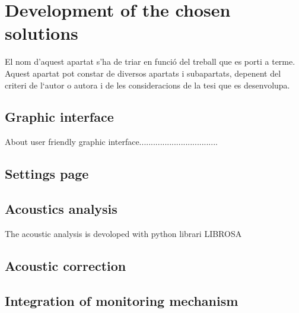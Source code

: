 \chapter{Development of the chosen solutions}

El nom d’aquest apartat s'ha de triar en funció del treball que es porti a terme. Aquest apartat pot constar de diversos apartats i subapartats, depenent del criteri de l‘autor o autora i de les consideracions de la tesi que es desenvolupa.

\section{Graphic interface}

About user friendly graphic interface..................................

\section{Settings page}


\section{Acoustics analysis}

The acoustic analysis is devoloped with python librari LIBROSA\cite{librosa}

\section{Acoustic correction}


\section{Integration of monitoring mechanism}